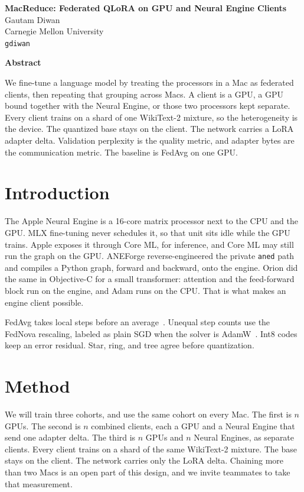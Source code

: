 \documentclass[10pt]{article}
\renewenvironment{abstract}{%
  \small
  \begin{center}\bfseries Abstract\end{center}%
  \vspace{-0.6em}%
  \quotation
}{\endquotation}
\begin{document}
\begin{center}
{\large\bfseries MacReduce: Federated QLoRA on GPU and Neural Engine Clients}\\[0.35em]
Gautam Diwan\\
Carnegie Mellon University\\
\texttt{gdiwan}
\end{center}
\vspace{-0.4em}
\begin{abstract}
We fine-tune a language model by treating the processors in a Mac as federated clients, then repeating that grouping across Macs. A client is a GPU, a GPU bound together with the Neural Engine, or those two processors kept separate. Every client trains on a shard of one WikiText-2 mixture, so the heterogeneity is the device. The quantized base stays on the client. The network carries a LoRA adapter delta. Validation perplexity is the quality metric, and adapter bytes are the communication metric. The baseline is FedAvg on one GPU.
\end{abstract}

\section{Introduction}
The Apple Neural Engine is a 16-core matrix processor next to the CPU and the GPU.
MLX fine-tuning never schedules it, so that unit sits idle while the GPU trains.
Apple exposes it through Core ML, for inference, and Core ML may still run the graph on the GPU.
ANEForge reverse-engineered the private \texttt{aned} path and compiles a Python graph, forward and backward, onto the engine.
Orion did the same in Objective-C for a small transformer: attention and the feed-forward block run on the engine, and Adam runs on the CPU.
That is what makes an engine client possible.

FedAvg takes local steps before an average~\cite{mcmahan2017}. Unequal step counts use the FedNova rescaling, labeled as plain SGD when the solver is AdamW~\cite{wang2020}. Int8 codes keep an error residual. Star, ring, and tree agree before quantization.

\section{Method}
We will train three cohorts, and use the same cohort on every Mac.
The first is \(n\) GPUs.
The second is \(n\) combined clients, each a GPU and a Neural Engine that send one adapter delta.
The third is \(n\) GPUs and \(n\) Neural Engines, as separate clients.
Every client trains on a shard of the same WikiText-2 mixture. The base stays on the client. The network carries only the LoRA delta.
Chaining more than two Macs is an open part of this design, and we invite teammates to take that measurement.
\end{document}
